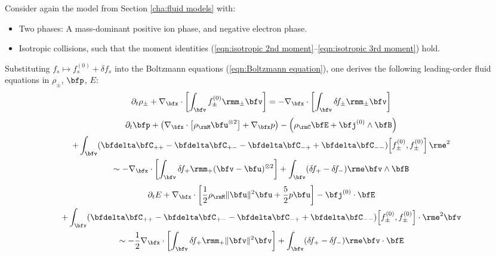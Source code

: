     \line
    
    Consider again the model from Section \ref{cha:fluid models} with:
    \begin{itemize}
        \item  Two phases: A mass-dominant positive ion phase, and negative electron phase.
        \item  Isotropic collisions, such that the moment identities (\ref{eqn:isotropic 2nd moment}--\ref{eqn:isotropic 3rd moment}) hold.
    \end{itemize}

    \shortline

    Substituting $f_{s}  \mapsto  f_{s}^{(0)} + \delta\!f_{s}$ into the Boltzmann equations (\ref{eqn:Boltzmann equation}), one derives the following leading-order fluid equations in $\rho_{\pm}$, $\bfp$, $E$:
    \begin{equation}\label{eqn:PiC-coupled mass conservation}
        \partial_{t}\rho_{\pm} + \nabla_{\bfx}\cdot\left[\int_{\bfv}f_{\pm}^{(0)}\rmm_{\pm}\bfv\right]  =  - \nabla_{\bfx}\cdot\left[\int_{\bfv}\delta\!f_{\pm}\rmm_{\pm}\bfv\right]
    \end{equation}
    \vspace{-20pt}
    \begin{multline}
        \partial_{t}\bfp + \left(\nabla_{\bfx}\cdot\left[\rho_{\rmM}\bfu^{\otimes 2}\right] + \nabla_{\bfx}p\right) - \left(\rho_{\rmC}\bfE + \bfj^{(0)}\wedge\bfB\right) \\
        + \int_{\bfv}(\bfdelta\bfC_{++} - \bfdelta\bfC_{+-} - \bfdelta\bfC_{-+} + \bfdelta\bfC_{--})\!\left[f_{\pm}^{(0)}, f_{\pm}^{(0)}\right]\rme^{2}  \\
        \sim  - \nabla_{\bfx}\cdot\left[\int_{\bfv}\delta\!f_{+}\rmm_{+}(\bfv - \bfu)^{\otimes 2}\right] + \int_{\bfv}(\delta\!f_{+} - \delta\!f_{-})\rme\bfv\wedge\bfB
    \end{multline}
    \vspace{-25pt}
    \begin{multline}
        \partial_{t}E + \nabla_{\bfx}\cdot\left[\frac{1}{2}\rho_{\rmM}\|\bfu\|^{2}\bfu + \frac{5}{2}p\bfu\right] - \bfj^{(0)}\cdot\bfE  \\
        + \int_{\bfv}(\bfdelta\bfC_{++} - \bfdelta\bfC_{+-} - \bfdelta\bfC_{-+} + \bfdelta\bfC_{--})\!\left[f_{\pm}^{(0)}, f_{\pm}^{(0)}\right]\cdot\rme^{2}\bfv  \\
        \sim  - \frac{1}{2}\nabla_{\bfx}\cdot\left[\int_{\bfv}\delta\!f_{+}\rmm_{+}\|\bfv\|^{2}\bfv\right] + \int_{\bfv}(\delta\!f_{+} - \delta\!f_{-})\rme\bfv\cdot\bfE
    \end{multline}
